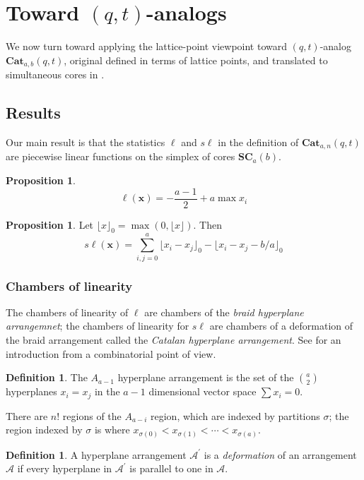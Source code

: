 \documentclass{amsart}[12pt]
\theoremstyle{definition}
\newtheorem{definition}[dummy]{Definition}
\newtheorem{proposition}[dummy]{Proposition}
\newcommand{\SC}{\mathbf{SC}}
\newcommand{\Cat}{\mathbf{Cat}}
\newcommand{\sk}{s\ell}
\begin{document}
\section{Toward \texorpdfstring{$(q,t)$}{(q,t)}-analogs} \label{sec:qt}

We now turn toward applying the lattice-point viewpoint toward $(q,t)$-analog $\Cat_{a,b}(q,t)$, original defined in terms of lattice points, and translated to simultaneous cores in \cite{AHJ}.  


\subsection{Results}
Our main result is that the statistics $\ell$ and $\sk$ in the definition of $\Cat_{a,n}(q,t)$ are piecewise linear functions on the simplex of cores $\SC_a(b)$.  

\begin{proposition}
\label{prop:length}
$$\ell(\mathbf{x})=-\frac{a-1}{2}+a\max x_i$$
\end{proposition}

\begin{proposition}
\label{prop:skewlength}
Let $\lfloor x\rfloor_0=\max\left(0, \lfloor x\rfloor\right)$.
Then
$$\sk(\mathbf{x})=\sum_{i,j=0}^a \lfloor x_i-x_j\rfloor_0 - \lfloor x_i-x_j-b/a\rfloor_0$$
\end{proposition}


\subsubsection{Chambers of linearity}

The chambers of linearity of $\ell$ are chambers of the \emph{braid hyperplane arrangemnet}; the chambers of linearity for $\sk$ are chambers of a deformation of the braid arrangement called the  \emph{Catalan hyperplane arrangement}.  See \cite{StanleyHyperplane} for an introduction from a combinatorial point of view.


\begin{definition}
The $A_{a-1}$ hyperplane arrangement is the set of the $\binom{a}{2}$ hyperplanes $x_i=x_j$ in the $a-1$ dimensional vector space $\sum x_i=0$.

There are $n!$ regions of the $A_{a-i}$ region, which are indexed by partitions $\sigma$; the region indexed by $\sigma$ is where $x_{\sigma(0)}<x_{\sigma(1)}<\cdots<x_{\sigma(a)}$.
\end{definition}

\begin{definition}
A hyperplane arrangement $\mathcal{A}^\prime$ is a \emph{deformation} of an arrangement $\mathcal{A}$ if every hyperplane in $\mathcal{A}^\prime$ is parallel to one in $\mathcal{A}$.
\end{definition}
\end{document}
